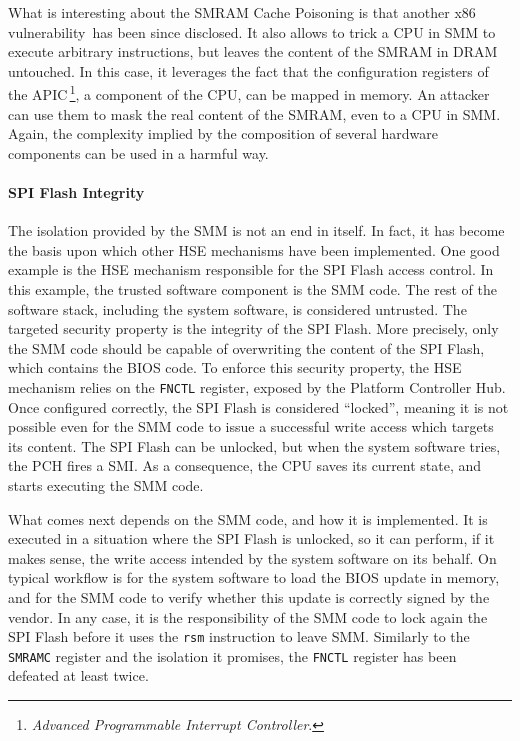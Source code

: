 What is interesting about the SMRAM Cache Poisoning is that another x86
vulnerability\,\cite{domas2015sinkhole} has been since disclosed.
%
It also allows to trick a CPU in SMM to execute arbitrary instructions, but
leaves the content of the SMRAM in DRAM untouched.
%
In this case, it leverages the fact that the configuration registers of the
APIC\,\footnote{\emph{Advanced Programmable Interrupt Controller}.}, a component
of the CPU, can be mapped in memory.
%
An attacker can use them to mask the real content of the SMRAM, even to a CPU in
SMM.
%
Again, the complexity implied by the composition of several hardware components
can be used in a harmful way.


\paragraph{SPI Flash Integrity}
%
The isolation provided by the SMM is not an end in itself.
%
In fact, it has become the basis upon which other HSE mechanisms have been
implemented.
%
One good example is the HSE mechanism responsible for the SPI Flash access
control.
%
In this example, the trusted software component is the SMM code.
%
The rest of the software stack, including the system software, is considered
untrusted.
%
The targeted security property is the integrity of the SPI Flash.
%
More precisely, only the SMM code should be capable of overwriting the content
of the SPI Flash, which contains the BIOS code.
%
To enforce this security property, the HSE mechanism relies on the
\texttt{FNCTL}  register,
exposed by the Platform Controller Hub.
%
Once configured correctly, the SPI Flash is considered ``locked'', meaning it is
not possible even for the SMM code to issue a successful write access which
targets its content.
%
The SPI Flash can be unlocked, but when the system software tries, the PCH fires
a SMI.
%
As a consequence, the CPU saves its current state, and starts executing the SMM
code.

What comes next depends on the SMM code, and how it is implemented.
%
It is executed in a situation where the SPI Flash is unlocked, so it can
perform, if it makes sense, the write access intended by the system software on
its behalf.
%
On typical workflow is for the system software to load the BIOS update in
memory, and for the SMM code to verify whether this update is correctly signed
by the vendor.
%
In any case, it is the responsibility of the SMM code to lock again the SPI
Flash before it uses the \texttt{rsm} instruction to leave SMM.
%
Similarly to the \texttt{SMRAMC} register and the isolation it promises, the
\texttt{FNCTL} register has been defeated at least twice.

